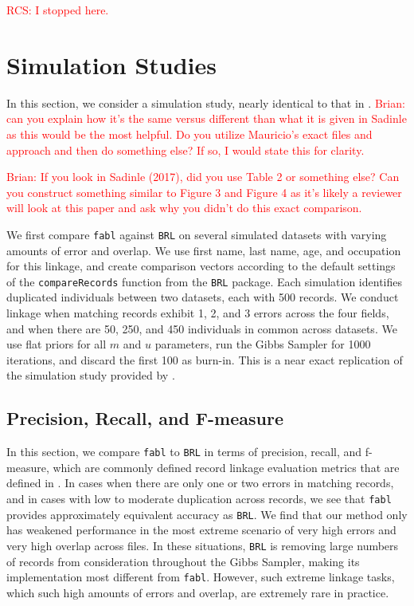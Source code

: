 \documentclass[12pt,letterpaper]{article}
\newcommand{\1}[1]{\mathbb{I}\!\left[#1\right]} %
\begin{document}
\textcolor{red}{RCS: I stopped here.}

\section{Simulation Studies}
\label{sec:simulations}
In this section, we consider a simulation study, nearly identical to that in \cite{sadinle2017}. \textcolor{red}{Brian: can you explain how it's the same versus different than what it is given in Sadinle as this would be the most helpful. Do you utilize Mauricio's exact files and approach and then do something else? If so, I would state this for clarity.} 

\textcolor{red}{Brian: If you look in Sadinle (2017), did you use Table 2 or something else? Can you construct something similar to Figure 3 and Figure 4 as it's likely a reviewer will look at this paper and ask why you didn't do this exact comparison.}

We first compare \texttt{fabl} against \texttt{BRL} on several simulated datasets with varying amounts of error and overlap. We use first name, last name, age, and occupation for this linkage, and create comparison vectors according to the default settings of the \texttt{compareRecords} function from the \texttt{BRL} package. Each simulation identifies duplicated individuals between two datasets, each with 500 records. We conduct linkage when matching records exhibit 1, 2, and 3 errors across the four fields, and when there are 50, 250, and 450 individuals in common across datasets. We use flat priors for all $m$ and $u$ parameters, run the Gibbs Sampler for 1000 iterations, and discard the first 100 as burn-in. This is a near exact replication of the simulation study provided by \citep{sadinle2017}. 



\hypertarget{accuracy}{%
	\subsection{Precision, Recall, and F-measure}\label{accuracy}}
	
In this section, we compare \texttt{fabl} to 	\texttt{BRL} in terms of precision, recall, and f-measure, which are commonly defined record linkage evaluation metrics that are defined in \citep{christen_2012}. 
%
In cases when there are only one or two errors in matching records, and in cases with low to moderate duplication across records, we see that \texttt{fabl} provides approximately equivalent accuracy as \texttt{BRL}. 
We find that our method only has weakened performance in the
most extreme scenario of very high errors and very high overlap across
files. In these situations, \texttt{BRL} is removing large numbers of records from consideration throughout the Gibbs Sampler, making its implementation most different from \texttt{fabl}. However,  such extreme linkage tasks, which such high amounts of errors and overlap, are extremely rare in practice. 
\end{document}

